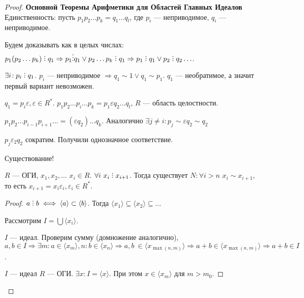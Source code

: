 \begin{proof}
\textbf{Основной Теоремы Арифметики для Областей Главных Идеалов} 
    Единственность: пусть $p_1p_2\ldots p_k =q_1 \ldots q_l$, где $p_i$ --- неприводимое,  $q_i$ --- неприводимое. 

    Будем доказывать как в целых числах:  $p_1(p_2\ldots p_k) \divby q_1 \Rightarrow p_1 \vdots q_1 \lor p_2\ldots p_k \divby q_1 \Rightarrow p_1 \divby q_1 \lor p_2 \divby q_2 \ldots$.

     $\exists i\!: p_i \divby q_1$. $p_i$ --- неприводимое $\Rightarrow q_1 \sim 1 \lor q_1 \sim p_1$. $q_1$ --- необратимое, а значит первый вариант невозможен.

     $q_1 = p_i \varepsilon, \varepsilon \in R^*$. $p_1p_2\ldots p_i \ldots p_k = p_1\varepsilon q_2 \ldots q_l$, $R$ --- область целостности.

     $p_1p_2\ldots p_{i-1}p_{i+1}\ldots = (\varepsilon q_2) \ldots q_k$. Аналогично $\exists j \neq i\!: p_j \sim \varepsilon q_2 \sim q_2$ 

     $p_j \varepsilon_2 q_2$ сократим. Получили однозначное соответствие. 


     Существование!
     \begin{lemma}
    $R$ --- ОГИ,  $x_1,x_2,\ldots$ $x_i \in R$.  $\forall i\ x_i \divby x_{i+1}$. Тогда существует  $N\!: \forall i > n$  $x_i \sim x_{i+1}$, то есть  $x_{i+1} = x_i \varepsilon_i, \varepsilon_i \in R^*$. 
    \end{lemma}
    \begin{proof}
        $a \divby b \iff \langle a \rangle \subset \langle b \rangle$. Тогда  $\langle x_1 \rangle \subseteq \langle x_2 \rangle \subseteq \ldots$

        Рассмотрим $I = \bigcup \langle x_i\rangle$.

        $I$ --- идеал. Проверим сумму (домножение аналогично),  $a, b \in I \Rightarrow \exists m\!: a \in \langle x_m \rangle, n\!: b \in \langle x_n \rangle \Rightarrow a, b\ \in \langle x_{\max(n, m)} \rangle \Rightarrow a + b \in \langle x_{\max(n, m)} \rangle \Rightarrow a + b \in I$.

        $I$ --- идеал  $R$ --- ОГИ.  $\exists x\!: I = \langle x \rangle$. При этом $x \in \langle x_m \rangle$ для  $m > m_0$.


\end{proof}
\end{proof}

